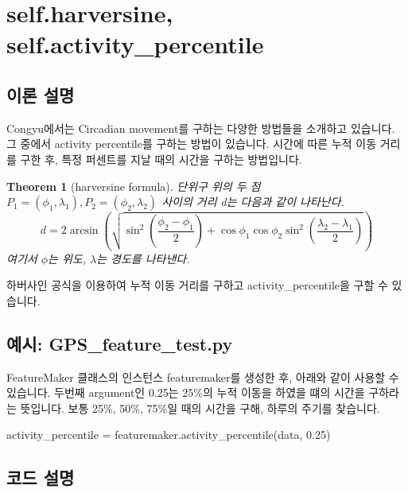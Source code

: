 \documentclass{oblivoir}
\newtheorem{theorem}{Theorem}
\begin{document}
  \section{self.harversine, self.activity\_percentile}
  \subsection{이론 설명}
  Congyu\cite{Congyu}에서는 Circadian movement를 구하는 다양한 방법들을 소개하고 있습니다.
  그 중에서 activity percentile를 구하는 방법이 있습니다.
  시간에 따른 누적 이동 거리를 구한 후, 특정 퍼센트를 지날 때의 시간을 구하는 방법입니다.
  \begin{theorem}[harversine formula]
    단위구 위의 두 점 $P_1=(\phi_1,\lambda_1),P_2=(\phi_2,\lambda_2)$ 사이의 거리 d는 다음과 같이 나타난다.
    \[d=2\arcsin(\sqrt{\sin^2(\frac{\phi_2-\phi_1}{2})+\cos\phi_1\cos\phi_2\sin^2(\frac{\lambda_2-\lambda_1}{2})})\]
    여기서 $\phi$는 위도, $\lambda$는 경도를 나타낸다.
  \end{theorem}
  하버사인 공식을 이용하여 누적 이동 거리를 구하고 activity\_percentile을 구할 수 있습니다.

  \subsection{예시: GPS\_feature\_test.py}
  FeatureMaker 클래스의 인스턴스 featuremaker를 생성한 후, 아래와 같이 사용할 수 있습니다.
  두번째 argument인 0.25는 25\%의 누적 이동을 하였을 떄의 시간을 구하라는 뜻입니다.
  보통 25\%, 50\%, 75\%일 때의 시간을 구해, 하루의 주기를 찾습니다.
  \begin{python}[label={GPS_feature_42}]
    activity_percentile = featuremaker.activity_percentile(data, 0.25)
  \end{python}

  \subsection{코드 설명}
\end{document}
